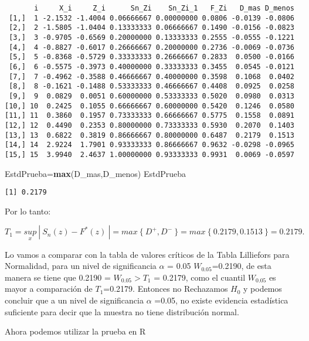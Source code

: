 \documentclass[
  a4paper,
  oneside,
  openany]{book}
\newenvironment{Shaded}{\begin{snugshade}}{\end{snugshade}}
\newcommand{\FunctionTok}[1]{\textcolor[rgb]{0.13,0.29,0.53}{\textbf{#1}}}
\newcommand{\NormalTok}[1]{#1}
\newcommand{\OtherTok}[1]{\textcolor[rgb]{0.56,0.35,0.01}{#1}}
\begin{document}
\begin{verbatim}
       i     X_i     Z_i      Sn_Zi    Sn_Zi_1   F_Zi   D_mas D_menos
 [1,]  1 -2.1532 -1.4004 0.06666667 0.00000000 0.0806 -0.0139 -0.0806
 [2,]  2 -1.5805 -1.0404 0.13333333 0.06666667 0.1490 -0.0156 -0.0823
 [3,]  3 -0.9705 -0.6569 0.20000000 0.13333333 0.2555 -0.0555 -0.1221
 [4,]  4 -0.8827 -0.6017 0.26666667 0.20000000 0.2736 -0.0069 -0.0736
 [5,]  5 -0.8368 -0.5729 0.33333333 0.26666667 0.2833  0.0500 -0.0166
 [6,]  6 -0.5575 -0.3973 0.40000000 0.33333333 0.3455  0.0545 -0.0121
 [7,]  7 -0.4962 -0.3588 0.46666667 0.40000000 0.3598  0.1068  0.0402
 [8,]  8 -0.1621 -0.1488 0.53333333 0.46666667 0.4408  0.0925  0.0258
 [9,]  9  0.0829  0.0051 0.60000000 0.53333333 0.5020  0.0980  0.0313
[10,] 10  0.2425  0.1055 0.66666667 0.60000000 0.5420  0.1246  0.0580
[11,] 11  0.3860  0.1957 0.73333333 0.66666667 0.5775  0.1558  0.0891
[12,] 12  0.4490  0.2353 0.80000000 0.73333333 0.5930  0.2070  0.1403
[13,] 13  0.6822  0.3819 0.86666667 0.80000000 0.6487  0.2179  0.1513
[14,] 14  2.9224  1.7901 0.93333333 0.86666667 0.9632 -0.0298 -0.0965
[15,] 15  3.9940  2.4637 1.00000000 0.93333333 0.9931  0.0069 -0.0597
\end{verbatim}

\begin{Shaded}
\begin{Highlighting}[]
\NormalTok{EstdPrueba}\OtherTok{=}\FunctionTok{max}\NormalTok{(D\_mas,D\_menos)}
\NormalTok{EstdPrueba}
\end{Highlighting}
\end{Shaded}

\begin{verbatim}
[1] 0.2179
\end{verbatim}

Por lo tanto:

\[T_{1}=\underset{x}{sup} \ | \ S_{n}(z)-F^*(z)\ |=max \ \{\ D^+,D^- \ \}=max \ \{ \  0.2179,0.1513 \ \}=0.2179. \]

Lo vamos a comparar con la tabla de valores críticos de la Tabla Lilliefors para Normalidad, para un nivel de significancia \(\alpha\) = 0.05 \(W_{0.05}\)=0.2190, de esta manera se tiene que 0.2190 = \(W_{0.05} > T_{1}\) = 0.2179, como el cuantil \(W_{0.05}\) es mayor a comparación de \(T_{1}\)=0.2179.
Entonces no Rechazamos \(H_0\) y podemos concluir que a un nivel de significancia \(\alpha\) =0.05, no existe evidencia estadística suficiente para decir que la muestra no tiene distribución normal.

Ahora podemos utilizar la prueba en R
\end{document}
